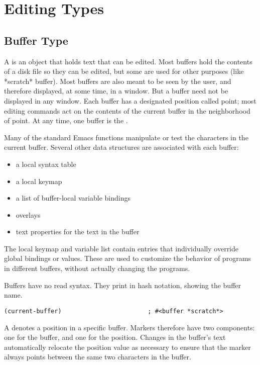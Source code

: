 \section{Editing Types}
\label{sec:editing-types}

\subsection{Buffer Type}
\label{sec:buffer-type}

A  is an object that holds text that can be edited.
Most buffers hold the contents of a disk file so they can be edited, but some are used for other purposes (like *scratch* buffer).
Most buffers are also meant to be seen by the user, and therefore displayed, at some time, in a window.
But a buffer need not be displayed in any window.
Each buffer has a designated position called point; most editing commands act on the contents of the current buffer in the neighborhood of point.
At any time, one buffer is the .


Many of the standard Emacs functions manipulate or test the characters in the current buffer.
Several other data structures are associated with each buffer:
\begin{itemize}
\item a local syntax table
\item a local keymap
\item a list of buffer-local variable bindings
\item overlays
\item text properties for the text in the buffer
\end{itemize}

The local keymap and variable list contain entries that individually override global bindings or values.
These are used to customize the behavior of programs in different buffers, without actually changing the programs.

Buffers have no read syntax.
They print in hash notation, showing the buffer name.
\begin{lstlisting}
(current-buffer)                        ; #<buffer *scratch*>
\end{lstlisting}


A  denotes a position in a specific buffer.
Markers therefore have two components: one for the buffer, and one for the position.
Changes in the buffer’s text automatically relocate the position value as necessary to ensure that the marker always points between the same two characters in the buffer.


